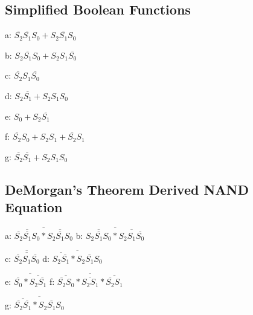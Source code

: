 \documentclass[11pt,a4paper]{article}
\begin{document}
\subsection{Simplified Boolean Functions}
a: $\overline{S_2}\overline{S_1}S_0 + S_2\overline{S_1}S_0$

b: $S_2\overline{S_1}S_0 + S_2S_1\overline{S_0}$

c: $\overline{S_2}S_1\overline{S_0}$

d: $S_2\overline{S_1} + S_2S_1S_0$

e: $S_0 + S_2\overline{S_1}$

f: $\overline{S_2}S_0 + S_2S_1 + \overline{S_2}S_1$

g: $\overline{S_2}\overline{S_1} + S_2S_1S_0$

\subsection{DeMorgan's Theorem Derived NAND Equation}
a: $\overline{\overline{\overline{S_2}\overline{S_1}S_0} * \overline{S_2\overline{S_1}S_0}}$
b: $\overline{\overline{S_2\overline{S_1}S_0} * \overline{S_2S_1\overline{S_0}}}$

c: $\overline{\overline{\overline{S_2}S_1\overline{S_0}}}$
d: $\overline{\overline{S_2\overline{S_1}} * \overline{S_2S_1S_0}}$

e: $\overline{\overline{S_0} * \overline{S_2\overline{S_1}}}$
f: $\overline{\overline{\overline{S_2}S_0} * \overline{S_2S_1} * \overline{\overline{S_2}S_1}}$

g: $\overline{\overline{\overline{S_2}\overline{S_1}} * \overline{S_2S_1S_0}}$
\end{document}
